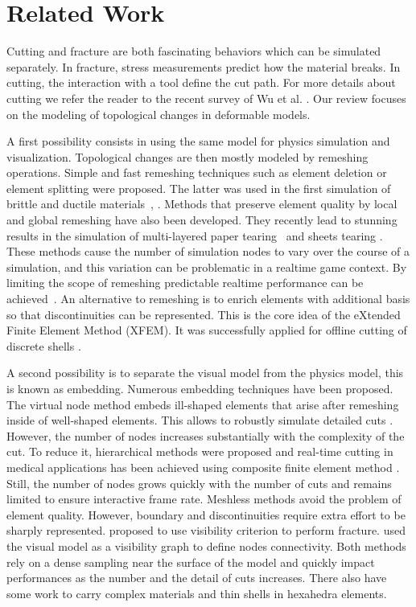 \section{Related Work}

Cutting and fracture are both fascinating behaviors which can be simulated separately. In fracture, stress measurements predict how the material breaks. In cutting, the interaction with a tool define the cut path. For more details about cutting we refer the reader to the recent survey of Wu et al. \cite{Wu2015}. Our review focuses on the modeling of topological changes in deformable models.

A first possibility consists in using the same model for physics simulation and visualization. Topological changes are then mostly modeled by remeshing operations. Simple and fast remeshing techniques such as element deletion or element splitting were proposed. The latter was used in the first simulation of brittle and ductile materials~\cite{OBrien1999}, \cite{OBrien2002}. 
 Methods that preserve element quality by local and global remeshing have also been developed. They recently lead to stunning results in the simulation of multi-layered paper tearing~\cite{Busaryev2013} and sheets tearing \cite{Pfaff2014}. 
These methods cause the number of simulation nodes to vary over the course of a simulation, and this variation can be problematic in a realtime game context.  By limiting the
scope of remeshing predictable realtime performance can be achieved~\cite{Parker2009}.
An alternative to remeshing is to enrich elements with additional basis so that discontinuities can be represented. This is the core idea of the eXtended Finite Element Method (XFEM). It was successfully applied for offline cutting of discrete shells \cite{Kaufmann2009}.

A second possibility is to separate the visual model from the physics model, this is known as embedding. Numerous embedding techniques have been proposed. The virtual node method \cite{Molino2004} embeds ill-shaped elements that arise after remeshing inside of well-shaped elements. This allows to robustly simulate detailed cuts \cite{Wang2014}. However, the number of nodes increases substantially with the complexity of the cut. To reduce it, hierarchical methods were proposed and real-time cutting in medical applications has been achieved using composite finite element method \cite{Wu2011}. Still, the number of nodes grows quickly with the number of cuts and remains limited to ensure interactive frame rate. Meshless methods avoid the problem of element quality. However, boundary and discontinuities require extra effort to be sharply represented. \cite{Pauly2005} proposed to use visibility criterion to perform fracture. \cite{Steinemann2009} used the visual model as a visibility graph to define nodes connectivity. Both methods rely on a dense sampling near the surface of the model and quickly impact performances as the number  and the detail of cuts increases. There also have some work to carry complex materials \cite{Nesme2009} and thin shells \cite{Remillard2013} in hexahedra elements.

